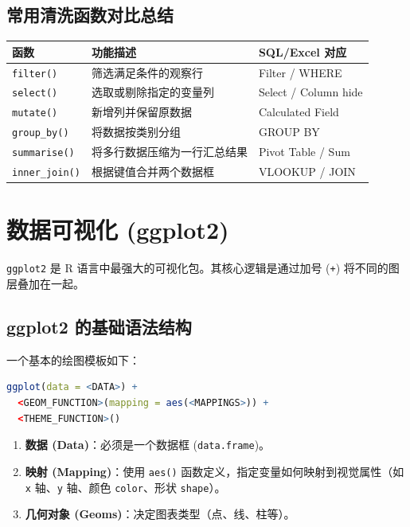 \subsection{常用清洗函数对比总结}
\begin{table}[h!]
\centering
\renewcommand{\arraystretch}{1.5}
\begin{tabular}{|l|p{6cm}|l|}
\hline
\textbf{函数} & \textbf{功能描述} & \textbf{SQL/Excel 对应} \\ \hline
\texttt{filter()} & 筛选满足条件的观察行 & Filter / WHERE \\ \hline
\texttt{select()} & 选取或剔除指定的变量列 & Select / Column hide \\ \hline
\texttt{mutate()} & 新增列并保留原数据 & Calculated Field \\ \hline
\texttt{group\_by()} & 将数据按类别分组 & GROUP BY \\ \hline
\texttt{summarise()} & 将多行数据压缩为一行汇总结果 & Pivot Table / Sum \\ \hline
\texttt{inner\_join()} & 根据键值合并两个数据框 & VLOOKUP / JOIN \\ \hline
\end{tabular}
\end{table}





\section{数据可视化 (ggplot2)}

\texttt{ggplot2} 是 R 语言中最强大的可视化包。其核心逻辑是通过加号 (\texttt{+}) 将不同的图层叠加在一起。

\subsection{ggplot2 的基础语法结构}
一个基本的绘图模板如下：
\begin{lstlisting}[language=R]
ggplot(data = <DATA>) + 
  <GEOM_FUNCTION>(mapping = aes(<MAPPINGS>)) +
  <THEME_FUNCTION>()
\end{lstlisting}

\begin{enumerate}[label=\arabic*., leftmargin=2em]
    \item \textbf{数据 (Data)}：必须是一个数据框 (\texttt{data.frame})。
    \item \textbf{映射 (Mapping)}：使用 \texttt{aes()} 函数定义，指定变量如何映射到视觉属性（如 \texttt{x} 轴、\texttt{y} 轴、颜色 \texttt{color}、形状 \texttt{shape}）。
    \item \textbf{几何对象 (Geoms)}：决定图表类型（点、线、柱等）。
\end{enumerate}



